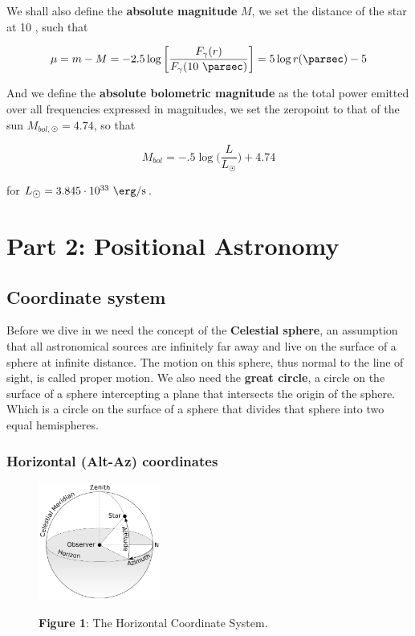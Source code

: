 \documentclass[a4paper]{article}
\begin{document}
We shall also define the \textbf{absolute magnitude} $M$, we set the distance of the star at 10 \si{\parsec}, such that

\begin{equation}
    \mu=m-M=-2.5\log\bigg[\frac{F_{\gamma}(r)}{F_{\gamma}(10 \ \si{\parsec})}\bigg]=5\log r(\si{\parsec})-5
\end{equation}

And we define the \textbf{absolute bolometric magnitude} as the total power emitted over all frequencies expressed in magnitudes, we set the zeropoint to that of the sun $M_{bol, \astrosun}=4.74$, so that

\begin{equation}
    M_{bol}=-.5\log\bigg(\frac{L}{L_{\astrosun}}\bigg)+4.74
\end{equation}

for $L_{\astrosun}=3.845\cdot 10^{33}\ \si{\erg\per\second}$.

\section{Part 2: Positional Astronomy}

\subsection{Coordinate system}

Before we dive in we need the concept of the \textbf{Celestial sphere}, an assumption that all astronomical sources are infinitely far away and live on the surface of a sphere at infinite distance. The motion on this sphere, thus normal to the line of sight, is called proper motion. We also need the \textbf{great circle}, a circle on the surface of a sphere intercepting a plane that intersects the origin of the sphere. Which is a circle on the surface of a sphere that divides that sphere into two equal hemispheres. 

\subsubsection*{Horizontal (Alt-Az) coordinates}

\begin{figure}[ht]
\centering
\includegraphics[width=4cm]{img/horizontal.png} \\
\caption*{\textbf{Figure 1}: The Horizontal Coordinate System.}
\end{figure}
\end{document}
